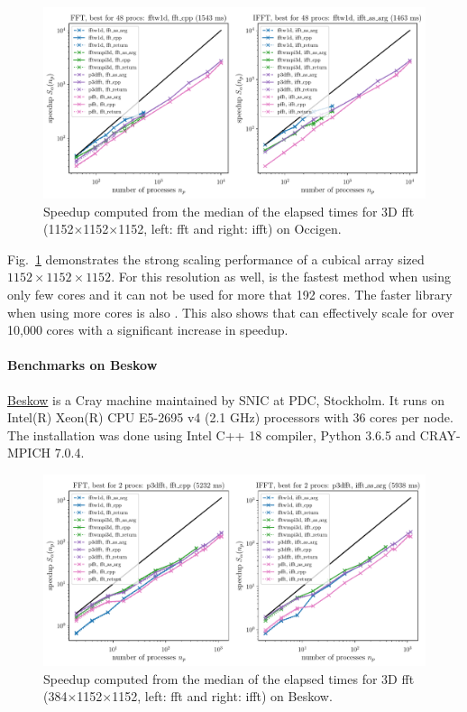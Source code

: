 \begin{figure}[htp!]
\centering
\includegraphics[width=\linewidth]{tmp/fig_occigen_1152x1152x1152}
\caption{Speedup computed from the median of the elapsed times for 3D fft
(1152$\times$1152$\times$1152, left: fft and right: ifft) on Occigen.}
\label{fig:occigen1152x1152x1152}
\end{figure}

Fig.~\ref{fig:occigen1152x1152x1152} demonstrates the strong scaling
performance of a cubical array sized $1152\times1152\times1152$. For this
resolution as well,  is the fastest method when using only
few cores and it can not be used for more that 192 cores. The faster library
when using more cores is also . This also shows that
 can effectively scale for over 10,000 cores with a significant
increase in speedup.


\paragraph{Benchmarks on Beskow}

\href{ https://www.pdc.kth.se/hpc-services/computing-systems}{Beskow} is a Cray
machine maintained by SNIC at PDC, Stockholm. It runs on Intel(R) Xeon(R) CPU
E5-2695 v4 (2.1 GHz) processors with 36 cores per node. The installation was
done using Intel C++ 18 compiler, Python 3.6.5 and CRAY-MPICH 7.0.4.

\begin{figure}[htp!]
\centering
\includegraphics[width=\linewidth]{tmp/fig_beskow_384x1152x1152}
\caption{Speedup computed from the median of the elapsed times for 3D fft
(384$\times$1152$\times$1152, left: fft and right: ifft) on Beskow.}
\label{fig:beskow384x1152x1152}
\end{figure}

